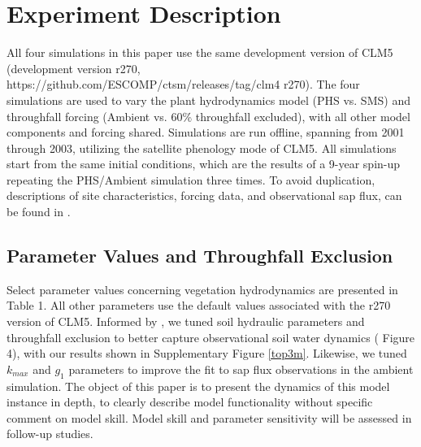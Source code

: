 \documentclass[draft,linenumbers]{agujournal}
\begin{document}
\section{Experiment Description}
All four simulations in this paper use the same development version of CLM5
(development version r270, https://github.com/ESCOMP/ctsm/releases/tag/clm4
\textunderscore r270).
The four simulations are used to vary the plant hydrodynamics model (PHS vs. SMS) and throughfall forcing (Ambient vs. 60\% throughfall excluded), with all other model components and forcing shared.
Simulations are run offline, spanning from 2001 through 2003, utilizing the satellite phenology mode of CLM5.
All simulations start from the same initial conditions, which are the results of a 9-year spin-up repeating the PHS/Ambient simulation three times.
To avoid duplication, descriptions of site characteristics, forcing data, and observational sap flux, can be found in \cite{fisher2007}.

\subsection{Parameter Values and Throughfall Exclusion}

Select parameter values concerning vegetation hydrodynamics are presented in Table 1.
All other parameters use the default values associated with the r270 version of CLM5.
Informed by \cite{fisher2008}, we tuned soil hydraulic parameters and throughfall exclusion to better capture observational soil water dynamics (\cite{fisher2007} Figure 4), with our results shown in Supplementary Figure \ref{top3m}.
Likewise, we tuned $k_{max}$ and $g_1$ parameters to improve the fit to sap flux observations in the ambient simulation.
The object of this paper is to present the dynamics of this model instance in depth, to clearly describe model functionality without specific comment on model skill.
Model skill and parameter sensitivity will be assessed in follow-up studies.
\end{document}
